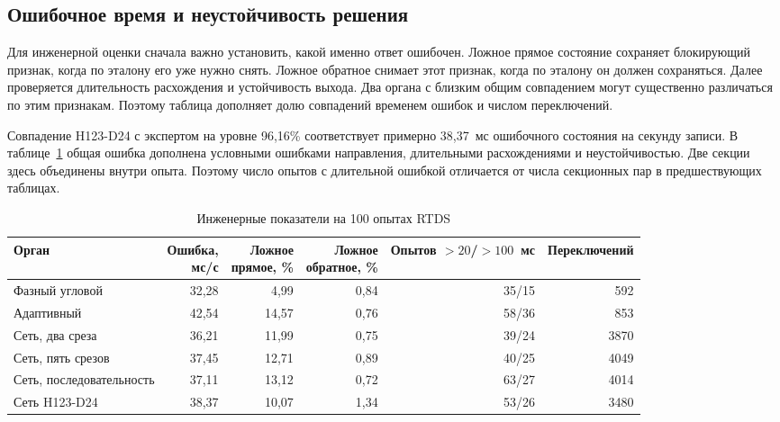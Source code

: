 \subsection{Ошибочное время и неустойчивость решения}

Для инженерной оценки сначала важно установить,
какой именно ответ ошибочен. Ложное прямое состояние
сохраняет блокирующий признак, когда по эталону его уже
нужно снять. Ложное обратное снимает этот признак,
когда по эталону он должен сохраняться.
Далее проверяется длительность расхождения и устойчивость выхода.
Два органа с близким общим совпадением могут существенно
различаться по этим признакам. Поэтому таблица дополняет
долю совпадений временем ошибок и числом переключений.

Совпадение H123-D24 с экспертом на уровне 96,16\%
соответствует примерно 38,37~мс ошибочного состояния
на секунду записи.
В таблице~\ref{tab:ch5_rtds_engineering}
общая ошибка дополнена условными ошибками направления,
длительными расхождениями и неустойчивостью.
Две секции здесь объединены внутри опыта.
Поэтому число опытов с длительной ошибкой
отличается от числа секционных пар
в предшествующих таблицах.

\begin{table}[htbp]
\centering\small
\caption{Инженерные показатели на 100 опытах RTDS}
\label{tab:ch5_rtds_engineering}
\setlength{\tabcolsep}{3pt}
\begin{tabular}{p{}rrrrr}
\toprule
Орган & \shortstack{Ошибка,\\мс/с}
 & \shortstack{Ложное\\прямое, \%}
 & \shortstack{Ложное\\обратное, \%}
 & \shortstack{Опытов\\$>20$/$>100$~мс}
 & Переключений \\
\midrule
Фазный угловой & 32,28 & 4,99 & 0,84 & 35/15 & 592 \\
Адаптивный & 42,54 & 14,57 & 0,76 & 58/36 & 853 \\
Сеть, два среза & 36,21 & 11,99 & 0,75 & 39/24 & 3870 \\
Сеть, пять срезов & 37,45 & 12,71 & 0,89 & 40/25 & 4049 \\
Сеть, последовательность & 37,11 & 13,12 & 0,72 & 63/27 & 4014 \\
Сеть H123-D24 & 38,37 & 10,07 & 1,34 & 53/26 & 3480 \\
\bottomrule
\end{tabular}
\end{table}

